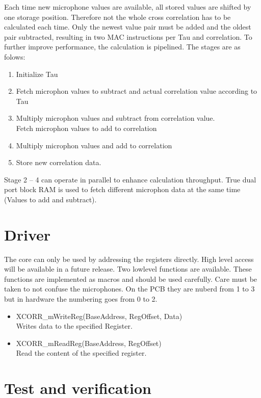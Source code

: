 Each time new microphone values are available, all stored values are shifted by one storage position.
Therefore not the whole cross correlation has to be calculated each time.
Only the newest value pair must be added and the oldest pair subtracted, resulting in two MAC instructions per Tau and correlation.
To further improve performance, the calculation is pipelined.
The stages are as folows:
\begin{enumerate}
	\item Initialize Tau
	\item Fetch microphon values to subtract and actual correlation value according to Tau
	\item Multiply microphon values and subtract from correlation value.\\
		Fetch microphon values to add to correlation
	\item Multiply microphon values and add to correlation
	\item Store new correlation data.
\end{enumerate}
Stage 2 -- 4 can operate in parallel to enhance calculation throughput.
True dual port block RAM is used to fetch different microphon data at the same time (Values to add and subtract).


\section{Driver}
\label{sec::driver}

The core can only be used by addressing the registers directly.
High level access will be available in a future release.
Two lowlevel functions are available.
These functions are implemented as macros and should be used carefully.
Care must be taken to not confuse the microphones. 
On the PCB they are nuberd from 1 to 3 but in hardware the numbering goes from 0 to 2.

\begin{itemize}
	\item XCORR\_mWriteReg(BaseAddress, RegOffset, Data) \\
		Writes data to the specified Register. 
	\item XCORR\_mReadReg(BaseAddress, RegOffset) \\		
		Read the content of the specified register.
\end{itemize}

\section{Test and verification}
\label{sec::test}


